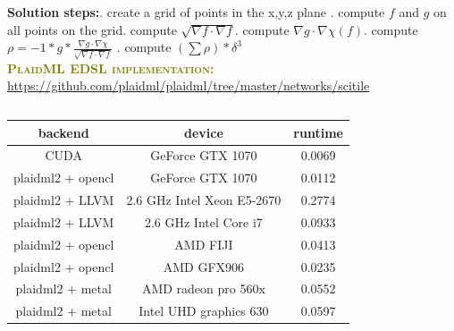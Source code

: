 \documentclass[9pt,twocolumn,twoside,notitlepage]{article}
\begin{document}
 \textbf{Solution steps:}. create a grid of points in the x,y,z plane . compute $f$ and $g$ on all points on the grid. compute $\sqrt{\nabla f \cdot \nabla f}$. compute $\nabla g \cdot \nabla \chi (f)$. compute $\rho = -1 * g * \frac{\nabla g \cdot \nabla 
 \chi}{\sqrt{\nabla f \cdot \nabla f}}$ . compute $(\sum \rho)*\delta^3$\newline
 \\[4in]
 {\normalfont\sffamily\bfseries\scshape\fontsize{12}{14}\selectfont \textcolor{olive} {PlaidML EDSL implementation:}}\newline
 \hyperlink{https://github.com/plaidml/plaidml/tree/master/networks/scitile}{https://github.com/plaidml/plaidml/tree/master/networks/scitile}
\inputminted{python}{networks/scitile/storti_integrals/docs/partial_diff.py}
 \begin{table}[htbp]
 \centering
 \begin{tabular}{ccc}
 \hline
 backend & device & runtime \\
 \hline
 CUDA  & GeForce GTX 1070  & 0.0069 \\
 plaidml2 + opencl & GeForce GTX 1070 & 0.0112 \\
 plaidml2 + LLVM  & 2.6 GHz Intel Xeon E5-2670 & 0.2774 \\
 plaidml2 + LLVM  &  2.6 GHz Intel Core i7 & 0.0933\\
 plaidml2 + opencl & AMD FIJI & 0.0413 \\
 plaidml2 + opencl & AMD GFX906 & 0.0235\\
 plaidml2 + metal & AMD radeon pro 560x & 0.0552 \\
 plaidml2 + metal &  Intel UHD graphics 630 & 0.0597 \\
 \hline
 \end{tabular}
   \label{tab:shapefunctions}
 \end{table}

 
\end{document}
